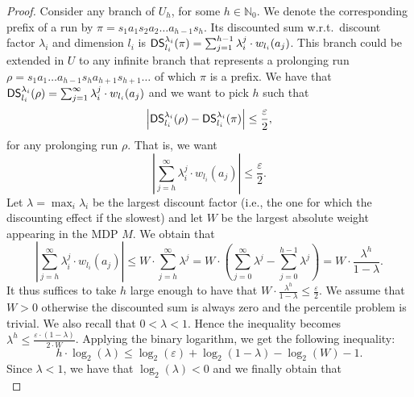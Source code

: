 \documentclass{llncs}
\newcommand{\discSum}[1]{\ensuremath{{\sf DS}^{#1}} }
\newcommand{\discount}{\ensuremath{\lambda} }
\newcommand{\nat}{\ensuremath{\mathbb{N}} }
\begin{document}
\begin{proof}
Consider any branch of $U_{h}$, for some $h \in \nat_{0}$. We denote the corresponding prefix of a run by $\pi = s_{1}a_{1}s_{2}a_{2}\ldots{}a_{h-1}s_{h}$. Its discounted sum w.r.t.~discount factor $\discount_{i}$ and dimension $l_{i}$ is $\discSum{\discount_{i}}_{l_{i}}(\pi) = \sum_{j = 1}^{h-1} \discount_{i}^{j}\cdot w_{l_{i}}(a_j)$. This branch could be extended in $U$ to any infinite branch that represents a prolonging run $\rho = s_{1}a_{1}\ldots{}a_{h-1}s_{h}a_{h+1}s_{h+1}\ldots{}$ of which $\pi$ is a prefix. We have that $\discSum{\discount_{i}}_{l_{i}}(\rho) = \sum_{j = 1}^{\infty} \discount_{i}^{j}\cdot w_{l_{i}}(a_j)$ and we want to pick $h$ such that
\begin{equation*}
\left\vert \discSum{\discount_{i}}_{l_{i}}(\rho) - \discSum{\discount_{i}}_{l_{i}}(\pi) \right\vert \leq \dfrac{\varepsilon}{2},
\end{equation*}
for any prolonging run $\rho$. That is, we want
\begin{equation*}
\left\vert \sum_{j = h}^{\infty} \discount_{i}^{j}\cdot w_{l_{i}}(a_j) \right\vert \leq \dfrac{\varepsilon}{2}.
\end{equation*}
Let $\discount = \max_{i} \discount_{i}$ be the largest discount factor (i.e., the one for which the discounting effect if the slowest) and let $W$ be the largest absolute weight appearing in the MDP $M$. We obtain that
\begin{equation*}
\left\vert \sum_{j = h}^{\infty} \discount_{i}^{j}\cdot w_{l_{i}}(a_j) \right\vert \leq W \cdot \sum_{j = h}^{\infty} \discount^{j} = W \cdot \left(\sum_{j = 0}^{\infty} \discount^{j} - \sum_{j = 0}^{h-1} \discount^{j}\right) = W \cdot \dfrac{\discount^{h}}{1-\discount}.
\end{equation*}
It thus suffices to take $h$ large enough to have that $W \cdot \frac{\discount^{h}}{1-\discount} \leq \frac{\varepsilon}{2}$. We assume that $W > 0$ otherwise the discounted sum is always zero and the percentile problem is trivial. We also recall that $0 < \discount < 1$. Hence the inequality becomes $\discount^{h} \leq \frac{\varepsilon\cdot (1 - \discount)}{2\cdot W}$. Applying the binary logarithm, we get the following inequality:
\begin{equation*}
h \cdot \log_{2}(\discount) \leq \log_{2}(\varepsilon) + \log_{2}(1 - \discount) - \log_{2}(W) - 1.
\end{equation*}
Since $\discount < 1$, we have that $\log_{2}(\discount) < 0$ and we finally obtain that
\begin{equation*}

\end{equation*}
\end{proof}
\end{document}
